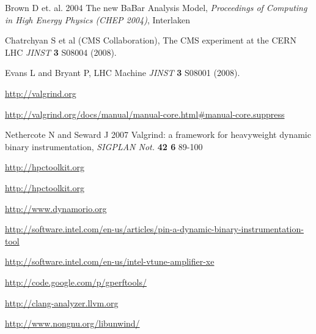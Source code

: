 \documentclass[notitlepage,letter,12pt]{article}
\begin{document}
\begin{thebibliography}{0}
 Brown D et. al. 2004 The new BaBar Analysis Model, {\it Proceedings of Computing in High Energy Physics (CHEP 2004)}, Interlaken

 Chatrchyan S et al (CMS Collaboration),  The CMS experiment at the CERN LHC {\it JINST} {\bf 3} S08004 (2008).

 Evans L and Bryant P,  LHC Machine {\it JINST} {\bf 3} S08001 (2008).







 \url{http://valgrind.org}

 \url{http://valgrind.org/docs/manual/manual-core.html\#manual-core.suppress}

 Nethercote N and Seward J 2007 Valgrind: a framework for heavyweight dynamic binary instrumentation, {\it SIGPLAN Not.} {\bf 42 6} 89-100

 \url{http://hpctoolkit.org}

 \url{http://hpctoolkit.org}

 \url{http://www.dynamorio.org}

 \url{http://software.intel.com/en-us/articles/pin-a-dynamic-binary-instrumentation-tool}

 \url{http://software.intel.com/en-us/intel-vtune-amplifier-xe}

 \url{http://code.google.com/p/gperftools/}

 \url{http://clang-analyzer.llvm.org}


 \url{http://www.nongnu.org/libunwind/}

\end{thebibliography}
\end{document}
